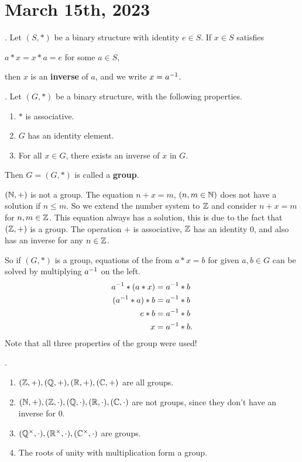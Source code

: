 \section*{March 15th, 2023}


.  Let \((S, *)\) be a binary structure with identity \(e \in S\). If \(x \in S\) satisfies
\begin{center}
    \(a * x = x * a = e\) for some \(a \in S\),
\end{center}
then \(x\) is an \textbf{inverse} of \(a\), and we write \(x = a^{-1}\).

.  Let \((G, *)\) be a binary structure, with the following properties.
\begin{enumerate}
    \item \(*\) is associative.
    \item \(G\) has an identity element.
    \item For all \(x \in G\), there exists an inverse of \(x\) in \(G\).
\end{enumerate}
Then \(G = (G, *)\) is called a \textbf{group}.

\((\mathbb{N}, +)\) is not a group. The equation \(n + x = m\), \((n, m \in \mathbb{N})\) does not have a solution if \(n \leq m\). So we extend the number system to \(\mathbb{Z}\) and consider \(n + x = m\) for \(n, m \in \mathbb{Z}\). This equation always has a solution, this is due to the fact that \((\mathbb{Z}, +)\) is a group. The operation \(+\) is associative, \(\mathbb{Z}\) has an identity \(0\), and also has an inverse for any \(n \in \mathbb{Z}\).

So if \((G, *)\) is a group, equations of the from \(a * x = b\) for given \(a, b \in G\) can be solved by multiplying \(a^{-1}\) on the left.
\[
    \begin{aligned}
        a^{-1} * (a * x) & = a^{-1} * b    \\
        (a^{-1} * a) * b & = a^{-1} * b  \\
        e * b           & = a^{-1} * b  \\
        x               & = a^{-1} * b.
    \end{aligned}
\]
Note that all three properties of the group were used!

\ex.
\begin{enumerate}
    \item \((\mathbb{Z}, +), (\mathbb{Q}, +), (\mathbb{R}, +), (\mathbb{C}, +)\) are all groups.
    \item \((\mathbb{N}, +), (\mathbb{Z}, \cdot), (\mathbb{Q}, \cdot), (\mathbb{R}, \cdot), (\mathbb{C}, \cdot)\) are not groups, since they don't have an inverse for \(0\).
    \item \((\mathbb{Q}^\times, \cdot), (\mathbb{R}^\times, \cdot), (\mathbb{C}^\times, \cdot)\) are groups.
    \item The roots of unity with multiplication form a group.
\end{enumerate}

